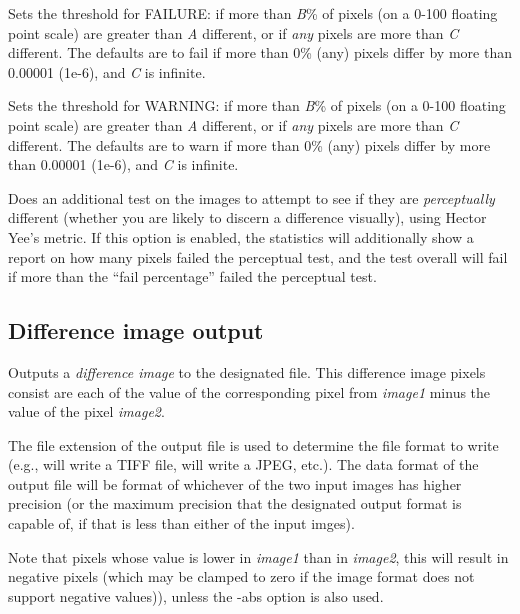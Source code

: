 
Sets the threshold for {\cf FAILURE}: if more than \emph{B}\% of pixels
(on a 0-100 floating point scale) are greater than \emph{A} different,
or if \emph{any} pixels are more than \emph{C} different.  The defaults
are to fail if more than 0\% (any) pixels differ by more than 0.00001
(1e-6), and \emph{C} is infinite.
\apiend


Sets the threshold for {\cf WARNING}: if more than \emph{B}\% of pixels
(on a 0-100 floating point scale) are greater than \emph{A} different,
or if \emph{any} pixels are more than \emph{C} different.  The defaults
are to warn if more than 0\% (any) pixels differ by more than 0.00001
(1e-6), and \emph{C} is infinite.
\apiend

Does an additional test on the images to attempt to see if they are
\emph{perceptually} different (whether you are likely to discern
a difference visually), using Hector Yee's metric.  If this option
is enabled, the statistics will additionally show a report on how
many pixels failed the perceptual test, and the test overall will
fail if more than the ``fail percentage'' failed the perceptual test.
\apiend

\subsection*{Difference image output}

Outputs a \emph{difference image} to the designated file.
This difference image pixels consist are each of the value of the
corresponding pixel from \emph{image1} minus the value of the
pixel \emph{image2}.  

The file extension of the output file is used to determine the file
format to write (e.g.,  will write a TIFF file,
 will write a JPEG, etc.).  The data format of the output
file will be format of whichever of the two input images has higher
precision (or the maximum precision that the designated output format is
capable of, if that is less than either of the input imges).

Note that pixels whose value is lower in \emph{image1} than in
\emph{image2}, this will result in negative pixels (which may be clamped
to zero if the image format does not support negative values)), unless
the {\cf -abs} option is also used.  
\apiend

